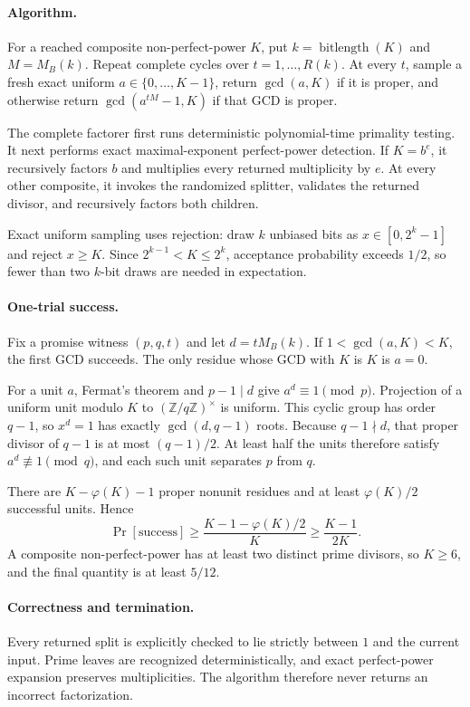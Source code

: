 \documentclass[11pt]{article}
\begin{document}
\paragraph{Algorithm.}
For a reached composite non-perfect-power \(K\), put
\(k=\operatorname{bitlength}(K)\) and
\(M=M_B(k)\). Repeat complete cycles over \(t=1,\ldots,R(k)\). At every
\(t\), sample a fresh exact uniform \(a\in\{0,\ldots,K-1\}\), return
\(\gcd(a,K)\) if it is proper, and otherwise return
\(\gcd(a^{tM}-1,K)\) if that GCD is proper.

The complete factorer first runs deterministic polynomial-time primality
testing. It next performs exact maximal-exponent perfect-power detection. If
\(K=b^e\), it recursively factors \(b\) and multiplies every returned
multiplicity by \(e\). At every other composite, it invokes the randomized
splitter, validates the returned divisor, and recursively factors both
children.

Exact uniform sampling uses rejection: draw \(k\) unbiased bits as
\(x\in[0,2^k-1]\) and reject \(x\ge K\). Since
\(2^{k-1}<K\le2^k\), acceptance probability exceeds \(1/2\), so fewer than two
\(k\)-bit draws are needed in expectation.

\paragraph{One-trial success.}
Fix a promise witness \((p,q,t)\) and let \(d=tM_B(k)\). If
\(1<\gcd(a,K)<K\), the first GCD succeeds. The only residue whose GCD with
\(K\) is \(K\) is \(a=0\).

For a unit \(a\), Fermat's theorem and \(p-1\mid d\) give
\(a^d\equiv1\pmod p\). Projection of a uniform unit modulo \(K\) to
\((\mathbb Z/q\mathbb Z)^\times\) is uniform. This cyclic group has order
\(q-1\), so \(x^d=1\) has exactly \(\gcd(d,q-1)\) roots. Because
\(q-1\nmid d\), that proper divisor of \(q-1\) is at most \((q-1)/2\).
At least half the units therefore satisfy \(a^d\not\equiv1\pmod q\), and each
such unit separates \(p\) from \(q\).

There are \(K-\varphi(K)-1\) proper nonunit residues and at least
\(\varphi(K)/2\) successful units. Hence
\[
\Pr[\mathrm{success}]
\ge\frac{K-1-\varphi(K)/2}{K}
\ge\frac{K-1}{2K}.
\]
A composite non-perfect-power has at least two distinct prime divisors, so
\(K\ge6\), and the final quantity is at least \(5/12\).

\paragraph{Correctness and termination.}
Every returned split is explicitly checked to lie strictly between \(1\) and
the current input. Prime leaves are recognized deterministically, and exact
perfect-power expansion preserves multiplicities. The algorithm therefore
never returns an incorrect factorization.
\end{document}
